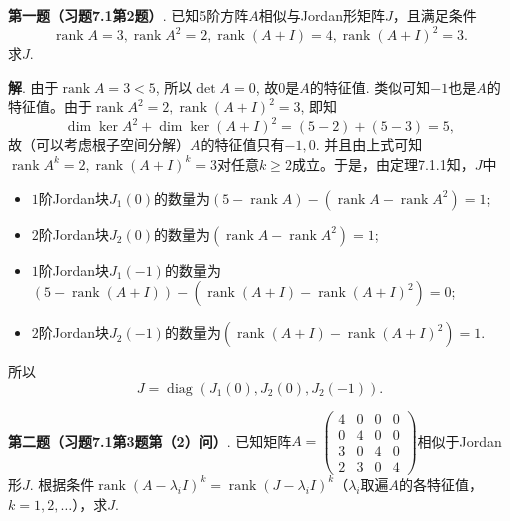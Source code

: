 
\renewcommand{\newpageorvspace}{\vspace{2em}}

\date{2022-4-8  第三次习题课}



\maketitle


{\bf 第一题（习题7.1第2题）}. 已知5阶方阵$A$相似与Jordan形矩阵$J$，且满足条件
$$\operatorname{rank}A = 3, \operatorname{rank}A^2 = 2, \operatorname{rank}(A+I) = 4, \operatorname{rank}(A+I)^2 = 3.$$
求$J$.

{\bf 解}. 由于$\operatorname{rank}A = 3 < 5$, 所以$\det A = 0$, 故$0$是$A$的特征值. 类似可知$-1$也是$A$的特征值。由于$\operatorname{rank}A^2 = 2, \operatorname{rank}(A+I)^2 = 3$, 即知
$$\dim \ker A^2 + \dim \ker (A+I)^2 = (5-2) + (5-3) = 5,$$
故（可以考虑根子空间分解）$A$的特征值只有$-1, 0$. 并且由上式可知$\operatorname{rank}A^k = 2, \operatorname{rank}(A+I)^k = 3$对任意$k\geqslant 2$成立。于是，由定理7.1.1知，$J$中
\begin{itemize}
\item $1$阶Jordan块$J_1(0)$的数量为$(5 - \operatorname{rank}A) - (\operatorname{rank}A - \operatorname{rank}A^2) = 1$;
\item $2$阶Jordan块$J_2(0)$的数量为$(\operatorname{rank}A - \operatorname{rank}A^2) = 1$;
\item $1$阶Jordan块$J_1(-1)$的数量为$(5 - \operatorname{rank}(A+I)) - (\operatorname{rank}(A+I) - \operatorname{rank}(A+I)^2) = 0$;
\item $2$阶Jordan块$J_2(-1)$的数量为$(\operatorname{rank}(A+I) - \operatorname{rank}(A+I)^2) = 1$.
\end{itemize}
所以
$$J = \operatorname{diag} (J_1(0), J_2(0), J_2(-1)).$$


\newpageorvspace


{\bf 第二题（习题7.1第3题第（2）问）}. 已知矩阵$A = \begin{pmatrix} 4 & 0 & 0 & 0 \\ 0 & 4 & 0 & 0 \\ 3 & 0 & 4 & 0 \\ 2 & 3 & 0 & 4 \end{pmatrix}$相似于Jordan形$J$. 根据条件$\operatorname{rank}(A - \lambda_i I)^k = \operatorname{rank}(J - \lambda_i I)^k$（$\lambda_i$取遍$A$的各特征值，$k=1,2,\ldots$），求$J$.

